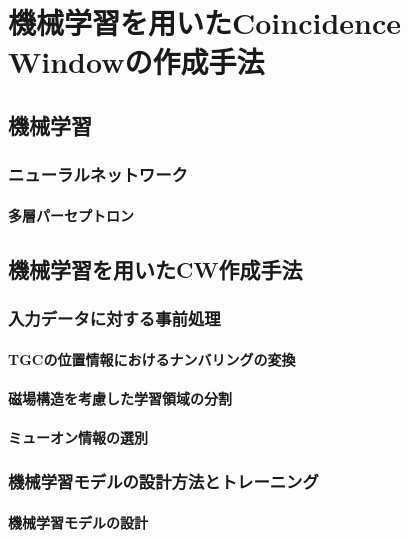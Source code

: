 \chapter{機械学習を用いたCoincidence Windowの作成手法}\label{chapter4}

\section{機械学習}\label{回帰分析}

\subsection{ニューラルネットワーク}

\subsubsection{多層パーセプトロン}

\section{機械学習を用いたCW作成手法}

\subsection{入力データに対する事前処理}\label{事前処理}

\subsubsection{TGCの位置情報におけるナンバリングの変換}

\subsubsection{磁場構造を考慮した学習領域の分割}

\subsubsection{ミューオン情報の選別}

\subsection{機械学習モデルの設計方法とトレーニング}

\subsubsection{機械学習モデルの設計}

